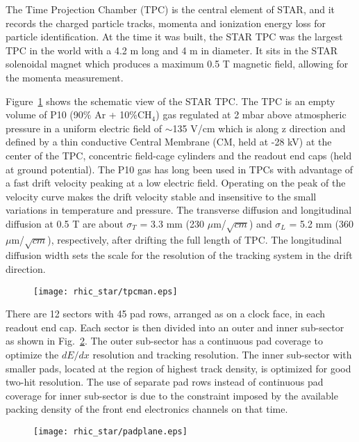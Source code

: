 The Time Projection Chamber (TPC) is the central element of STAR, and it records the charged particle tracks, momenta and ionization energy loss for particle identification. At the time it was built, the STAR TPC was the largest TPC in the world with a 4.2 m long and 4 m in diameter.  It sits in the STAR solenoidal magnet which produces a maximum 0.5 T magnetic field,  allowing for the momenta measurement.

Figure~\ref{tpccage} shows the schematic view of the STAR TPC. The TPC is an empty volume of P10 (90\% Ar + 10\%CH$_{4}$) gas regulated at 2 mbar above atmospheric pressure in a uniform electric field of $\sim$135 V/cm which is along z direction and defined by a thin conductive Central Membrane (CM, held at -28 kV) at the center of  the TPC, concentric field-cage cylinders and the readout end caps (held at ground potential). The P10 gas has long been used in TPCs with advantage of a fast drift velocity peaking at a low electric field. Operating on the peak of the velocity curve makes the drift velocity stable and insensitive to the small variations in temperature and pressure. The transverse diffusion and longitudinal diffusion at 0.5 T are about $\sigma_{T}$ = 3.3 mm (230 $\mu$m/$\sqrt{cm}$) and $\sigma_{L}$ = 5.2 mm (360 $\mu$m/$\sqrt{cm}$), respectively, after drifting the full length of TPC. The longitudinal diffusion width sets the scale for the resolution of the tracking system in the drift direction.

\begin{figure}[htbp]
\centering
\texttt{[image: rhic\_star/tpcman.eps]}
 \label{tpccage}
\end{figure}

There are 12 sectors with 45 pad rows, arranged as on a clock face, in each readout end cap. Each sector is then divided into an outer and inner sub-sector as shown in Fig.~\ref{padplane}. The outer sub-sector has a continuous pad coverage to optimize the $dE/dx$ resolution and tracking resolution. The inner sub-sector with smaller pads, located at the region of highest track density, is optimized for good two-hit resolution. The use of separate pad rows instead of continuous pad coverage for inner sub-sector is due to the constraint imposed by the available packing density of the front end electronics channels on that time.

\begin{figure}[htbp]
\centering
\texttt{[image: rhic\_star/padplane.eps]}
 \label{padplane}
\end{figure}

